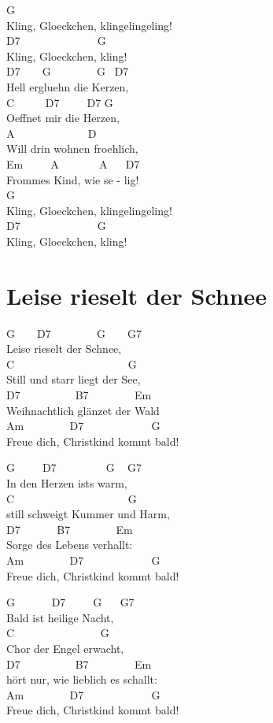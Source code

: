 \documentclass[
  letterpaper,
  twoside=false]{scrbook}
\begin{document}
G\\
Kling, Gloeckchen, klingelingeling!\\
D7 ~ ~ ~ ~ ~ ~ ~ ~ G\\
Kling, Gloeckchen, kling!\\
D7 ~ ~ G ~ ~ ~ ~ ~G ~D7\\
Hell ergluehn die Kerzen,\\
C ~ ~ ~ D7 ~ ~ ~D7 G\\
Oeffnet mir die Herzen,\\
A ~ ~ ~ ~ ~ ~ ~ ~D\\
Will drin wohnen froehlich,\\
Em ~ ~ ~A ~ ~ ~ ~ A ~ ~D7\\
Frommes Kind, wie se - lig!\\
G\\
Kling, Gloeckchen, klingelingeling!\\
D7 ~ ~ ~ ~ ~ ~ ~ ~ G\\
Kling, Gloeckchen, kling!

\hypertarget{leise-rieselt-der-schnee}{%
\chapter{Leise rieselt der Schnee}\label{leise-rieselt-der-schnee}}

G ~ ~ D7 ~ ~ ~ ~ ~G ~ ~ G7\\
Leise rieselt der Schnee,\\
C ~ ~ ~ ~ ~ ~ ~ ~ ~ ~ ~ ~ G\\
Still und starr liegt der See,\\
D7 ~ ~ ~ ~ ~ ~B7 ~ ~ ~ ~ ~Em\\
Weihnachtlich glänzet der Wald\\
Am ~ ~ ~ ~ ~D7 ~ ~ ~ ~ ~ ~ ~ G\\
Freue dich, Christkind kommt bald!

G ~ ~ ~D7 ~ ~ ~ ~ ~ G ~ G7\\
In den Herzen ist\textquotesingle s warm,\\
C ~ ~ ~ ~ ~ ~ ~ ~ ~ ~ ~ ~ G\\
still schweigt Kummer und Harm,\\
D7 ~ ~ ~ ~B7 ~ ~ ~ ~ ~Em\\
Sorge des Lebens verhallt:\\
Am ~ ~ ~ ~ ~D7 ~ ~ ~ ~ ~ ~ ~ G\\
Freue dich, Christkind kommt bald!

G ~ ~ ~ ~D7 ~ ~ ~G ~ ~G7\\
Bald ist heilige Nacht,\\
C ~ ~ ~ ~ ~ ~ ~ ~ ~ G\\
Chor der Engel erwacht,\\
D7 ~ ~ ~ ~ ~ ~B7 ~ ~ ~ ~ ~Em\\
hört nur, wie lieblich es schallt:\\
Am ~ ~ ~ ~ ~D7 ~ ~ ~ ~ ~ ~ ~ G\\
Freue dich, Christkind kommt bald!
\end{document}
